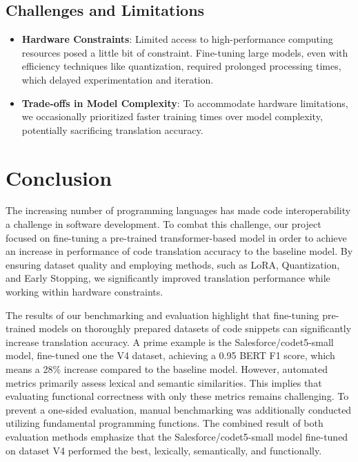 \documentclass[conference]{IEEEtran}
\begin{document}
\subsection*{Challenges and Limitations}
\begin{itemize}
    \item \textbf{Hardware Constraints}: Limited access to high-performance computing resources posed a little bit of constraint. Fine-tuning large models, even with efficiency techniques like quantization, required prolonged processing times, which delayed experimentation and iteration.
    
    \item \textbf{Trade-offs in Model Complexity}: To accommodate hardware limitations, we occasionally prioritized faster training times over model complexity, potentially sacrificing translation accuracy.
\end{itemize}

\section{Conclusion}\label{conc}
The increasing number of programming languages has made code interoperability a challenge in software development. To combat this challenge, our project focused on fine-tuning a pre-trained transformer-based model in order to achieve an increase in performance of code translation accuracy to the baseline model. By ensuring dataset quality and employing methods, such as LoRA, Quantization, and Early Stopping, we significantly improved translation performance while working within hardware constraints.

The results of our benchmarking and evaluation highlight that fine-tuning pre-trained models on thoroughly prepared datasets of code snippets can significantly increase translation accuracy. A prime example is the Salesforce/codet5-small model, fine-tuned one the V4 dataset, achieving a 0.95 BERT F1 score, which means a 28\% increase compared to the baseline model. However, automated metrics primarily assess lexical and semantic similarities. This implies that evaluating functional correctness with only these metrics remains challenging. To prevent a one-sided evaluation, manual benchmarking was additionally conducted utilizing fundamental programming functions. The combined result of both evaluation methods emphasize that the Salesforce/codet5-small model fine-tuned on dataset V4 performed the best, lexically, semantically, and functionally.
\end{document}
